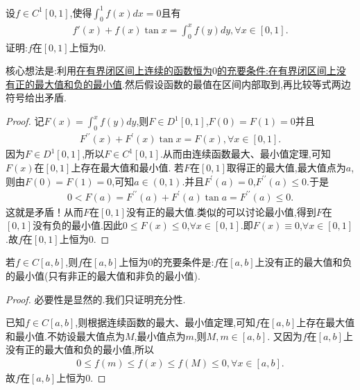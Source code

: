 \documentclass[lang=cn,newtx,10pt,scheme=chinese]{elegantbook}
\begin{document}
\begin{example}
  设$f\in C^1\left[ 0,1 \right] $,使得$\int_0^1{f\left( x \right) dx}=0$且有
  \begin{align*}
    f'\left( x \right) +f\left( x \right) \tan x=\int_0^x{f\left( y \right) dy,\forall x\in \left[ 0,1 \right] .}
  \end{align*}
证明:$f$在$[0,1]$上恒为$0$.
\end{example}
\begin{note}
  核心想法是:利用\hyperref[conclusion:在有界闭区间上连续的函数恒为$0$的充要条件:在有界闭区间上没有正的最大值和负的最小值]{在有界闭区间上连续的函数恒为$0$的充要条件:在有界闭区间上没有正的最大值和负的最小值}.然后假设函数的最值在区间内部取到,再比较等式两边符号给出矛盾.
\end{note}
\begin{proof}
  记\(F(x) = \int_{0}^{x}f(y)dy\),则\(F \in D^1[0,1]\),\(F(0) = F(1) = 0\)并且
\begin{align*}
  F^{\prime\prime}(x) + F^{\prime}(x)\tan x = F(x),\forall x \in [0,1].
\end{align*}
因为\(F \in D^1[0,1]\),所以\(F \in C^1[0,1]\).从而由连续函数最大、最小值定理,可知\(F(x)\)在\([0,1]\)上存在最大值和最小值.
若\(F\)在\([0,1]\)取得正的最大值,最大值点为\(a\),则由\(F(0) = F(1) = 0\),可知\(a \in (0,1)\).并且\(F^{\prime}(a) = 0\),\(F^{\prime\prime}(a) \leqslant 0\).于是
\begin{align*}
  0 < F(a) = F^{\prime\prime}(a) + F^{\prime}(a)\tan a = F^{\prime\prime}(a) \leqslant 0.
\end{align*}
这就是矛盾！从而\(F\)在\([0,1]\)没有正的最大值.类似的可以讨论最小值,得到\(F\)在\([0,1]\)没有负的最小值.因此\(0 \leqslant F(x) \leqslant 0\),\(\forall x \in [0,1]\).即\(F(x) \equiv 0\),\(\forall x \in [0,1]\).故\(f\)在\([0,1]\)上恒为\(0\). 
\end{proof}
\begin{conclusion}\label{conclusion:在有界闭区间上连续的函数恒为$0$的充要条件:在有界闭区间上没有正的最大值和负的最小值}
  若$f\in C[a,b]$,则$f$在$[a,b]$上恒为$0$的充要条件是:$f$在$[a,b]$上没有正的最大值和负的最小值(只有非正的最大值和非负的最小值).
\begin{proof}
必要性是显然的.我们只证明充分性.

已知$f\in C[a,b]$,则根据连续函数的最大、最小值定理,可知$f$在$[a,b]$上存在最大值和最小值.不妨设最大值点为$M$,最小值点为$m$,则$M,m\in[a,b]$.
又因为$f$在$[a,b]$上没有正的最大值和负的最小值,所以
\begin{align*}
  0\leq f(m)\leq f(x)\leq f(M)\leq 0,\forall x\in[a,b].
\end{align*}
故$f$在$[a,b]$上恒为$0$.
\end{proof}
\end{conclusion}
\end{document}
